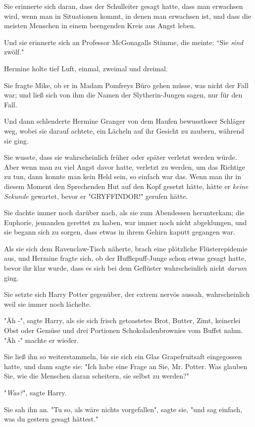 {Sie erinnerte sich daran, dass der Schulleiter gesagt hatte, dass man erwachsen wird, wenn man in Situationen kommt, in denen man erwachsen ist, und dass die meisten Menschen in einem beengenden Kreis aus Angst leben.

Und sie erinnerte sich an Professor McGonagalls Stimme, die meinte: “Sie \emph{sind} zwölf."

Hermine holte tief Luft, einmal, zweimal und dreimal.

Sie fragte Mike, ob er in Madam Pomfreys Büro gehen müsse, was nicht der Fall war; und ließ sich von ihm die Namen der Slytherin-Jungen sagen, nur für den Fall.

Und dann schlenderte Hermine Granger von dem Haufen bewusstloser Schläger weg, wobei sie darauf achtete, ein Lächeln auf ihr Gesicht zu zaubern, während sie ging.

Sie wusste, dass sie wahrscheinlich früher oder später verletzt werden würde. Aber wenn man zu viel Angst davor hatte, verletzt zu werden, um das Richtige zu tun, dann konnte man kein Held sein, so einfach war das. Wenn man ihr in diesem Moment den Sprechenden Hut auf den Kopf gesetzt hätte, hätte er \emph{keine Sekunde} gewartet, bevor er "GRYFFINDOR!" gerufen hätte.

Sie dachte immer noch darüber nach, als sie zum Abendessen herunterkam; die Euphorie, jemanden gerettet zu haben, war immer noch nicht abgeklungen, und sie begann sich zu sorgen, dass etwas in ihrem Gehirn kaputt gegangen war.

Als sie sich dem Ravenclaw-Tisch näherte, brach eine plötzliche Flüsterepidemie aus, und Hermine fragte sich, ob der Hufflepuff-Junge schon etwas gesagt hatte, bevor ihr klar wurde, dass es sich bei dem Geflüster wahrscheinlich nicht \emph{darum} ging.

Sie setzte sich Harry Potter gegenüber, der extrem nervös aussah, wahrscheinlich weil sie immer noch lächelte.

"Äh -", sagte Harry, als sie sich frisch getoastetes Brot, Butter, Zimt, keinerlei Obst oder Gemüse und drei Portionen Schokoladenbrownies vom Buffet nahm. "Äh -" machte er wieder.

Sie ließ ihn so weiterstammeln, bis sie sich ein Glas Grapefruitsaft eingegossen hatte, und dann sagte sie: "Ich habe eine Frage an Sie, Mr. Potter. Was glauben Sie, wie die Menschen daran scheitern, sie selbst zu werden?"

"\emph{Was?}", sagte Harry.

Sie sah ihn an. "Tu so, als wäre nichts vorgefallen", sagte sie, "und sag einfach, was du gestern gesagt hättest."

}
